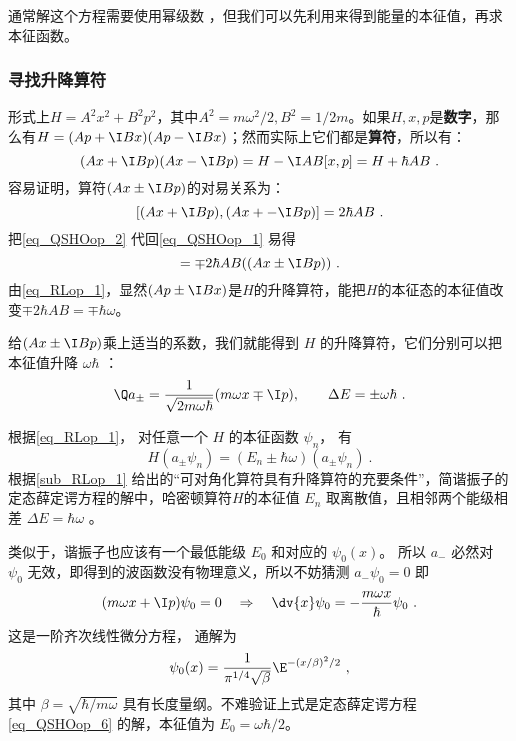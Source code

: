 通常解这个方程需要使用幂级数%
，但我们可以先利用来得到能量的本征值，再求本征函数。


\subsubsection{寻找升降算符}

形式上$H=A^2x^2+B^2p^2$，其中$A^2=m\omega^2/2, B^2=1/2m$。如果$H, x, p$是\textbf{数字}，那么有$H = (Ap+\I Bx)(Ap-\I Bx)$；然而实际上它们都是\textbf{算符}，所以有：
\begin{equation}\label{eq_QSHOop_1}
(Ax+\I Bp)(Ax-\I Bp) = H-\I AB[x, p] = H+\hbar AB~.
\end{equation}
容易证明，算符$(Ax\pm\I Bp)$的对易关系为：
\begin{equation}\label{eq_QSHOop_2}
[(Ax+\I Bp), (Ax+-\I Bp)] = 2\hbar AB~.
\end{equation}
把\autoref{eq_QSHOop_2} 代回\autoref{eq_QSHOop_1} 易得
\begin{equation}
[H, (Ax\pm\I Bp) = [H+ \hbar AB, (Ax\pm\I Bp)] = \mp 2\hbar AB ((Ax\pm\I Bp))~.
\end{equation}
由\autoref{eq_RLop_1}，显然$(Ap\pm \I Bx)$是$H$的升降算符，能把$H$的本征态的本征值改变$\mp 2\hbar AB=\mp \hbar \omega$。

给$(Ax\pm\I Bp)$乘上适当的系数，我们就能得到 $H$ 的升降算符，它们分别可以把本征值升降 $\omega\hbar$ ：
\begin{equation}
\Q a_\pm = \frac{1}{\sqrt{2m\omega\hbar}} (m\omega x \mp \I p), 
\qquad
\Delta E = \pm \omega \hbar~.
\end{equation}

根据\autoref{eq_RLop_1}， 对任意一个 $H$ 的本征函数 $\psi_n$， 有
\begin{equation}
H(a_\pm\psi_n) = (E_n\pm\hbar\omega) (a_ \pm \psi_n)~.
\end{equation}
根据\autoref{sub_RLop_1} 给出的“可对角化算符具有升降算符的充要条件”，简谐振子的定态薛定谔方程的解中，哈密顿算符$H$的本征值 $E_n$ 取离散值，且相邻两个能级相差 $\Delta E = \hbar \omega$ 。



类似于，谐振子也应该有一个最低能级 $E_0$ 和对应的 $\psi_0(x)$。 所以 $a_-$ 必然对 $\psi_0$ 无效，即得到的波函数没有物理意义，所以不妨猜测 $a_- \psi_0 = 0$ 
即
\begin{equation}
(m\omega x + \I p)\psi_0 = 0
\quad \Rightarrow \quad
\dv{x} \psi_0 =  - \frac{m\omega x}{\hbar } \psi_0~.
\end{equation}
这是一阶齐次线性微分方程，%
通解为
\begin{equation}
\psi_0(x) = \frac{1}{\pi^{1/4}\sqrt\beta} \E^{-(x/\beta)^2/2}~,
\end{equation}
其中 $\beta = \sqrt{\hbar /m\omega}$ 具有长度量纲。不难验证上式是定态薛定谔方程\autoref{eq_QSHOop_6} 的解，本征值为 $E_0=\omega\hbar/2$。



